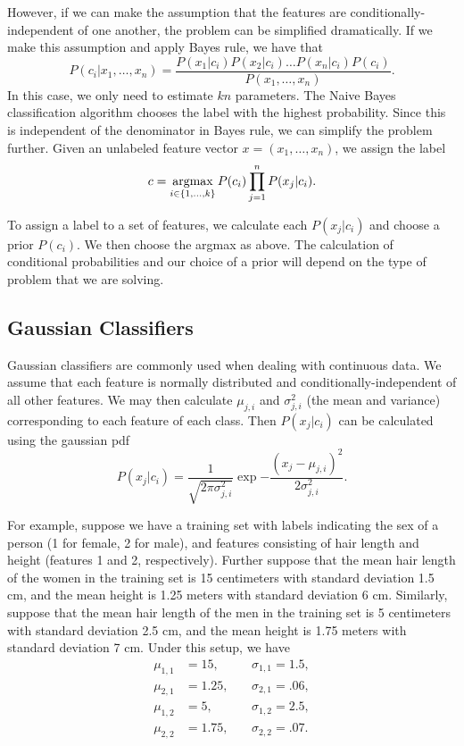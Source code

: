 However, if we can make the assumption that the features are conditionally-independent of one another, the problem can be simplified dramatically.
If we make this assumption and apply Bayes rule, we have that
\[
P(c_i | x_1, \ldots, x_n) = \frac{P(x_1|c_i)P(x_2|c_i)\ldots P(x_n|c_i)P(c_i)}{P(x_1,\ldots,x_n)}.
\]
In this case, we only need to estimate $kn$ parameters.
The Naive Bayes classification algorithm chooses the label with the highest probability.
Since this is independent of the denominator in Bayes rule, we can simplify the problem further.
Given an unlabeled feature vector $x=(x_1,\ldots,x_n)$, we assign the label
\[
c = \underset{i \in \{1, \ldots, k\}}{\mbox{argmax}}\, P(c_i)\prod_{j=1}^n P(x_j|c_i).
\]

To assign a label to a set of features, we calculate each $P(x_j|c_i)$ and choose a prior $P(c_i)$.
We then choose the argmax as above.
The calculation of conditional probabilities and our choice of a prior will depend on the type of problem that we are solving.

\subsection*{Gaussian Classifiers}

Gaussian classifiers are commonly used when dealing with continuous data.
We assume that each feature is normally distributed and conditionally-independent of all other features.
We may then calculate $\mu_{j,i}$ and $\sigma^2_{j,i}$ (the mean and variance) corresponding to each feature of each class.
Then $P(x_j|c_i)$ can be calculated using the gaussian pdf
\[
P(x_j|c_i) = \frac{1}{\sqrt{2\pi\sigma_{j,i}^2}}\exp{-\frac{(x_j - \mu_{j,i})^2}{2\sigma^2_{j,i}}}.
\]

For example, suppose we have a training set with labels indicating the sex of a person (1 for female, 2 for male), and  features consisting of hair length and height (features 1 and 2, respectively).
Further suppose that the mean hair length of the women in the training set is 15 centimeters with standard deviation 1.5 cm, and the mean height is 1.25 meters with standard deviation 6 cm.
Similarly, suppose that the mean hair length of the men in the training set is 5 centimeters with standard deviation 2.5 cm, and the mean height is 1.75 meters with standard deviation 7 cm.
Under this setup, we have
\begin{align*}
\mu_{1,1} &= 15, \quad &&\sigma_{1,1} = 1.5,\\
\mu_{2,1} &= 1.25, &&\sigma_{2,1} = .06,\\
\mu_{1,2} &= 5, &&\sigma_{1,2} = 2.5,\\
\mu_{2,2} &= 1.75, &&\sigma_{2,2} = .07.
\end{align*}

